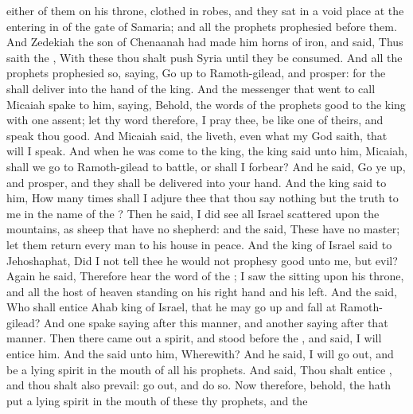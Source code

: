 {either of them on his
throne,
clothed in
{}
robes, and they
sat in a void
place at the entering
in of the
gate of
Samaria; and all the
prophets
prophesied
before them.
And
Zedekiah the
son of
Chenaanah had
made him
horns of
iron, and
said, Thus
saith the
{}, With these thou shalt
push
Syria until they be
consumed.
And all the
prophets
prophesied so,
saying, Go
up to
Ramoth-gilead, and
prosper: for the
{} shall
deliver
{} into the
hand of the
king.
And the
messenger that
went to
call
Micaiah
spake to him,
saying, Behold, the
words of the
prophets
{}
good to the
king with
one
assent; let thy
word therefore, I pray thee, be like
one of theirs, and
speak thou
good.
And
Micaiah
said,
{} the
{}
liveth, even what my
God
saith, that will I
speak.
And when he was
come to the
king, the
king
said unto him,
Micaiah, shall we
go to
Ramoth-gilead to
battle, or shall I
forbear? And he
said, Go ye
up, and
prosper, and they shall be
delivered into your
hand.
And the
king
said to him, How many
times shall I
adjure thee that thou
say nothing but the
truth to me in the
name of the
{}?
Then he
said, I did
see all
Israel
scattered upon the
mountains, as
sheep that have no
shepherd: and the
{}
said, These have no
master; let them
return
{} every
man to his
house in
peace.
And the
king of
Israel
said to
Jehoshaphat, Did I not
tell thee
{} he would not
prophesy
good unto me, but
evil?
Again he
said, Therefore
hear the
word of the
{}; I
saw the
{}
sitting upon his
throne, and all the
host of
heaven
standing on his right
hand and
{} his
left.
And the
{}
said, Who shall
entice
Ahab
king of
Israel, that he may go
up and
fall at
Ramoth-gilead? And one
spake
saying after this
manner, and another
saying after that
manner.
Then there came
out a
spirit, and
stood
before the
{}, and
said, I will
entice him. And the
{}
said unto him, Wherewith?
And he
said, I will go
out, and be a
lying
spirit in the
mouth of all his
prophets. And
{}
said, Thou shalt
entice
{}, and thou shalt also
prevail: go
out, and
do
{} so.
Now therefore, behold, the
{} hath
put a
lying
spirit in the
mouth of these thy
prophets, and the
}
